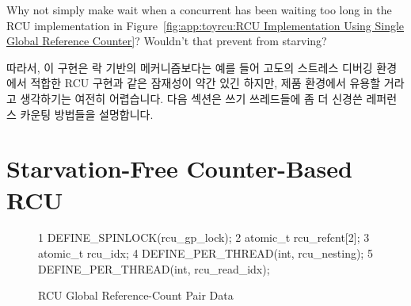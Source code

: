 	Why not simply make  wait when a concurrent
	 has been waiting too long in
	the RCU implementation in
	Figure~\ref{fig:app:toyrcu:RCU Implementation Using Single Global Reference Counter}?
	Wouldn't that prevent  from starving?
	\fi
{} \QuickQuizEnd

따라서, 이 구현은 락 기반의 메커니즘보다는 예를 들어 고도의 스트레스 디버깅
환경에서 적합한 RCU 구현과 같은 잠재성이 약간 있긴 하지만, 제품 환경에서 유용할
거라고 생각하기는 여전히 어렵습니다.
다음 섹션은 쓰기 쓰레드들에 좀 더 신경쓴 레퍼런스 카운팅 방법들을 설명합니다.
\iffalse

Therefore, it is still hard to imagine this implementation being useful
in a production setting, though it has a bit more potential
than the lock-based mechanism, for example, as an RCU implementation
suitable for a high-stress debugging environment.
The next section describes a variation on the reference-counting
scheme that is more favorable to writers.
\fi

\section{Starvation-Free Counter-Based RCU}
\label{sec:app:toyrcu:Starvation-Free Counter-Based RCU}

\begin{figure}[tbp]
{ \scriptsize
\begin{verbbox}
  1 DEFINE_SPINLOCK(rcu_gp_lock);
  2 atomic_t rcu_refcnt[2];
  3 atomic_t rcu_idx;
  4 DEFINE_PER_THREAD(int, rcu_nesting);
  5 DEFINE_PER_THREAD(int, rcu_read_idx);
\end{verbbox}
}
\centering
\theverbbox
\caption{RCU Global Reference-Count Pair Data}
\label{fig:app:toyrcu:RCU Global Reference-Count Pair Data}
\end{figure}

